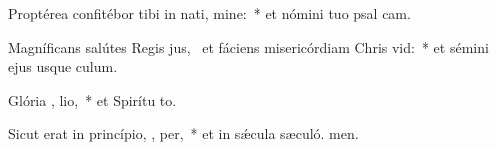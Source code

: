 \item Proptérea confitébor tibi in nati, mine:~* et nómini tuo psal cam.
\item Magníficans salútes Regis jus,~\pscross{} et fáciens misericórdiam Chris  vid:~* et sémini ejus usque  culum.
\item Glória ,  lio,~* et Spirítu to.
\item Sicut erat in princípio,  ,  per,~* et in sǽcula sæculó. men.
